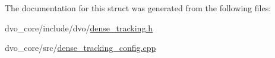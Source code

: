 The documentation for this struct was generated from the following files\+:\begin{DoxyCompactItemize}
\item 
dvo\+\_\+core/include/dvo/\mbox{\hyperlink{dense__tracking_8h}{dense\+\_\+tracking.\+h}}\item 
dvo\+\_\+core/src/\mbox{\hyperlink{dense__tracking__config_8cpp}{dense\+\_\+tracking\+\_\+config.\+cpp}}\end{DoxyCompactItemize}
